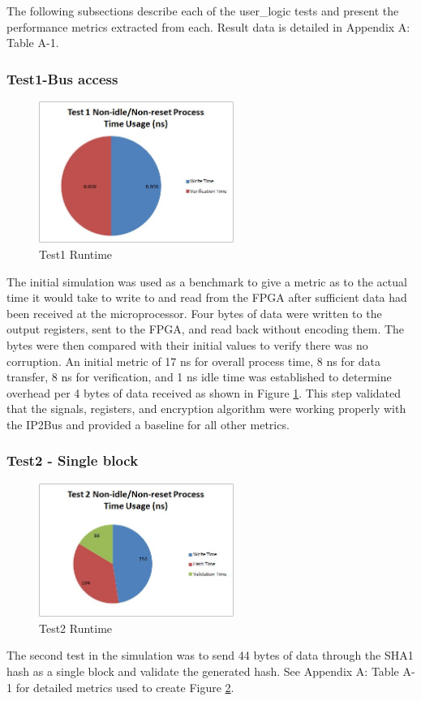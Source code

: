 \documentclass[journal]{IEEEtran}
\begin{document}
The following subsections describe each of the user\_logic tests and present the performance metrics extracted from each.  Result data is detailed in Appendix A: Table A-1.
\subsubsection{Test1-Bus access}
\begin{figure}[ht]
\centering
\includegraphics[width=2.5in]{Test1.jpg}
\caption{Test1 Runtime}
\label{fig_test1Runtime}
\end{figure} 
The initial simulation was used as a benchmark to give a metric as to the actual time it would take to write to and read from the FPGA after sufficient data had been received at the microprocessor.  Four bytes of data were written to the output registers, sent to the FPGA, and read back without encoding them.  The bytes were then compared with their initial values to verify there was no corruption.  An initial metric of 17 ns for overall process time, 8 ns for data transfer, 8 ns for verification, and 1 ns idle time was established to determine overhead per 4 bytes of data received as shown in Figure \ref{fig_test1Runtime}.  This step validated that the signals, registers, and encryption algorithm were working properly with the IP2Bus and provided a baseline for all other metrics.
\subsubsection{Test2 - Single block}
\begin{figure}[ht]
\centering
\includegraphics[width=2.5in]{Test2.jpg}
\caption{Test2 Runtime}
\label{fig_test2Runtime}
\end{figure} 
The second test in the simulation was to send 44 bytes of data through the SHA1 hash as a single block and validate the generated hash.  See Appendix A: Table A-1 for detailed metrics used to create Figure \ref{fig_test2Runtime}.
\end{document}
